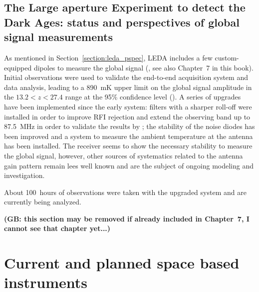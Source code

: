 \subsection{The Large aperture Experiment to detect the Dark Ages: status and perspectives of global signal measurements}
\label{leda_global}
As mentioned in Section~\ref{section:leda_pspec}, LEDA includes a few custom-equipped dipoles to measure the global signal (\cite{price18}, see also Chapter~7 in this book). Initial observations were used to validate the end-to-end acquisition system and data analysis, leading to a 890~mK upper limit on the global signal amplitude in the $13.2 < z < 27.4$ range at the 95\% confidence level (\cite{bernardi16}). A series of upgrades have been implemented since the early system: filters with a sharper roll-off were installed in order to improve RFI rejection and extend the observing band up to 87.5~MHz in order to validate the results by \cite{bowman18}; the stability of the noise diodes has been improved and a system to measure the ambient temperature at the antenna has been installed. The receiver seems to show the necessary stability to measure the global signal, however, other sources of systematics related to the antenna gain pattern remain lees well known and are the subject of ongoing modeling and investigation.

About 100~hours of observations were taken with the upgraded system and are currently being analyzed.

{\bf (GB: this section may be removed if already included in Chapter~7, I cannot see that chapter yet...)}


\section{Current and planned space based instruments}

